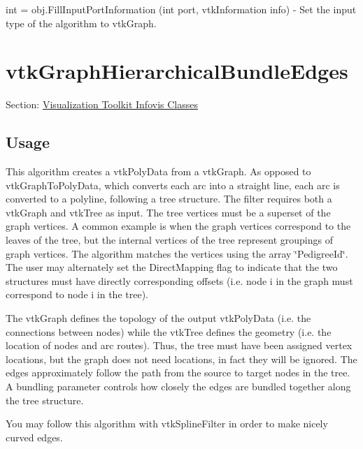 \begin{DoxyItemize}
\item {\ttfamily int = obj.\-Fill\-Input\-Port\-Information (int port, vtk\-Information info)} -\/ Set the input type of the algorithm to vtk\-Graph.  
\end{DoxyItemize}\hypertarget{vtkinfovis_vtkgraphhierarchicalbundleedges}{}\section{vtk\-Graph\-Hierarchical\-Bundle\-Edges}\label{vtkinfovis_vtkgraphhierarchicalbundleedges}
Section\-: \hyperlink{sec_vtkinfovis}{Visualization Toolkit Infovis Classes} \hypertarget{vtkwidgets_vtkxyplotwidget_Usage}{}\subsection{Usage}\label{vtkwidgets_vtkxyplotwidget_Usage}
This algorithm creates a vtk\-Poly\-Data from a vtk\-Graph. As opposed to vtk\-Graph\-To\-Poly\-Data, which converts each arc into a straight line, each arc is converted to a polyline, following a tree structure. The filter requires both a vtk\-Graph and vtk\-Tree as input. The tree vertices must be a superset of the graph vertices. A common example is when the graph vertices correspond to the leaves of the tree, but the internal vertices of the tree represent groupings of graph vertices. The algorithm matches the vertices using the array \char`\"{}\-Pedigree\-Id\char`\"{}. The user may alternately set the Direct\-Mapping flag to indicate that the two structures must have directly corresponding offsets (i.\-e. node i in the graph must correspond to node i in the tree).

The vtk\-Graph defines the topology of the output vtk\-Poly\-Data (i.\-e. the connections between nodes) while the vtk\-Tree defines the geometry (i.\-e. the location of nodes and arc routes). Thus, the tree must have been assigned vertex locations, but the graph does not need locations, in fact they will be ignored. The edges approximately follow the path from the source to target nodes in the tree. A bundling parameter controls how closely the edges are bundled together along the tree structure.

You may follow this algorithm with vtk\-Spline\-Filter in order to make nicely curved edges.

